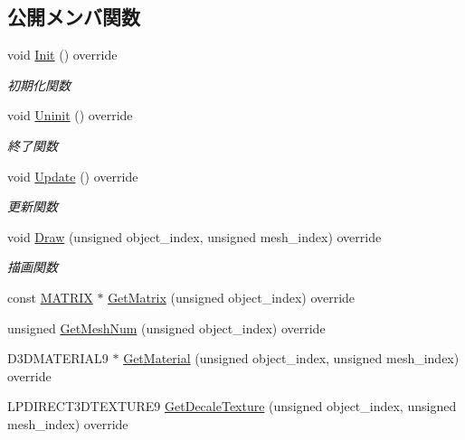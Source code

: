 \subsection*{公開メンバ関数}
\begin{DoxyCompactItemize}
\item 
void \mbox{\hyperlink{class_tutorial_logo_draw_a53fc4b1b23c7f9e249600be67510f944}{Init}} () override
\begin{DoxyCompactList}\small\item\em 初期化関数 \end{DoxyCompactList}\item 
void \mbox{\hyperlink{class_tutorial_logo_draw_a949fb70954e3df28f87b8ed5c61bf8f1}{Uninit}} () override
\begin{DoxyCompactList}\small\item\em 終了関数 \end{DoxyCompactList}\item 
void \mbox{\hyperlink{class_tutorial_logo_draw_af69405fcc8b20684a19e982726d93ffa}{Update}} () override
\begin{DoxyCompactList}\small\item\em 更新関数 \end{DoxyCompactList}\item 
void \mbox{\hyperlink{class_tutorial_logo_draw_aa808cfb8bc59d58bbd698a195603429f}{Draw}} (unsigned object\+\_\+index, unsigned mesh\+\_\+index) override
\begin{DoxyCompactList}\small\item\em 描画関数 \end{DoxyCompactList}\item 
const \mbox{\hyperlink{_vector3_d_8h_a032295cd9fb1b711757c90667278e744}{M\+A\+T\+R\+IX}} $\ast$ \mbox{\hyperlink{class_tutorial_logo_draw_ab700e592d00574dff6ee342138343d7b}{Get\+Matrix}} (unsigned object\+\_\+index) override
\item 
unsigned \mbox{\hyperlink{class_tutorial_logo_draw_a19de254c5460e3728d7c79243fd65e6f}{Get\+Mesh\+Num}} (unsigned object\+\_\+index) override
\item 
D3\+D\+M\+A\+T\+E\+R\+I\+A\+L9 $\ast$ \mbox{\hyperlink{class_tutorial_logo_draw_a3a97860361e32a727246e99052715f37}{Get\+Material}} (unsigned object\+\_\+index, unsigned mesh\+\_\+index) override
\item 
L\+P\+D\+I\+R\+E\+C\+T3\+D\+T\+E\+X\+T\+U\+R\+E9 \mbox{\hyperlink{class_tutorial_logo_draw_ad9df98aa8a5b11872dba6f6609589035}{Get\+Decale\+Texture}} (unsigned object\+\_\+index, unsigned mesh\+\_\+index) override
\end{DoxyCompactItemize}


